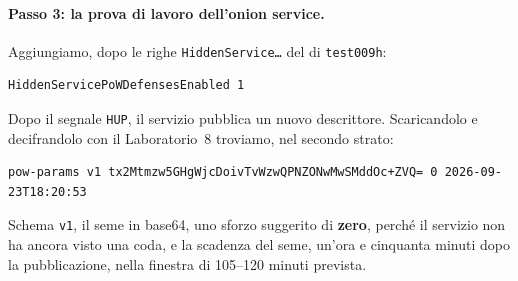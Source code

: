 \paragraph{Passo 3: la prova di lavoro dell'onion service.} Aggiungiamo, dopo le righe \texttt{HiddenService\ldots} del  di \texttt{test009h}:
\begin{lstlisting}[language=torrc,numbers=none]
HiddenServicePoWDefensesEnabled 1
\end{lstlisting}
Dopo il segnale \texttt{HUP}, il servizio pubblica un nuovo descrittore. Scaricandolo e decifrandolo con il Laboratorio~8 troviamo, nel secondo strato:
\begin{lstlisting}[numbers=none]
pow-params v1 tx2Mtmzw5GHgWjcDoivTvWzwQPNZONwMwSMddOc+ZVQ= 0 2026-09-23T18:20:53
\end{lstlisting}
Schema \texttt{v1}, il seme in base64, uno sforzo suggerito di \textbf{zero}, perché il servizio non ha ancora visto una coda, e la scadenza del seme, un'ora e cinquanta minuti dopo la pubblicazione, nella finestra di 105--120 minuti prevista.

